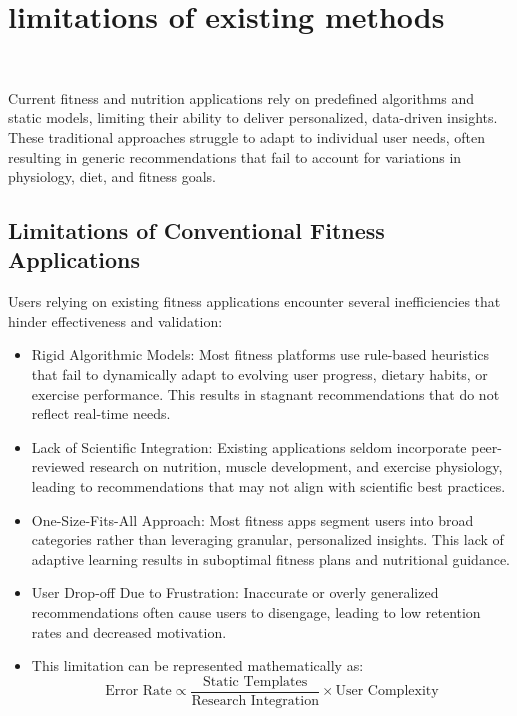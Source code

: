 \documentclass[conference]{IEEEtran}
\begin{document}
\section{limitations of existing methods}\

Current fitness and nutrition applications rely on predefined algorithms and static models, limiting their ability to deliver personalized, data-driven insights. These traditional approaches struggle to adapt to individual user needs, often resulting in generic recommendations that fail to account for variations in physiology, diet, and fitness goals.

\subsection{Limitations of Conventional Fitness Applications}

Users relying on existing fitness applications encounter several inefficiencies that hinder effectiveness and validation:\\

\begin{itemize}
	\item Rigid Algorithmic Models: Most fitness platforms use rule-based heuristics that fail to dynamically adapt to evolving user progress, dietary habits, or exercise performance. This results in stagnant recommendations that do not reflect real-time needs.
	\item Lack of Scientific Integration: Existing applications seldom incorporate peer-reviewed research on nutrition, muscle development, and exercise physiology, leading to recommendations that may not align with scientific best practices. \cite{7}
	\item One-Size-Fits-All Approach: Most fitness apps segment users into broad categories rather than leveraging granular, personalized insights. This lack of adaptive learning results in suboptimal fitness plans and nutritional guidance.
	\item User Drop-off Due to Frustration: Inaccurate or overly generalized recommendations often cause users to disengage, leading to low retention rates and decreased motivation. \cite{8}
        \item This limitation can be represented mathematically as:
            \begin{equation}
            \text{Error Rate} \propto \frac{\text{Static Templates}}{\text{Research Integration}} \times \text{User Complexity}
\end{equation}
\end{itemize}
\end{document}
